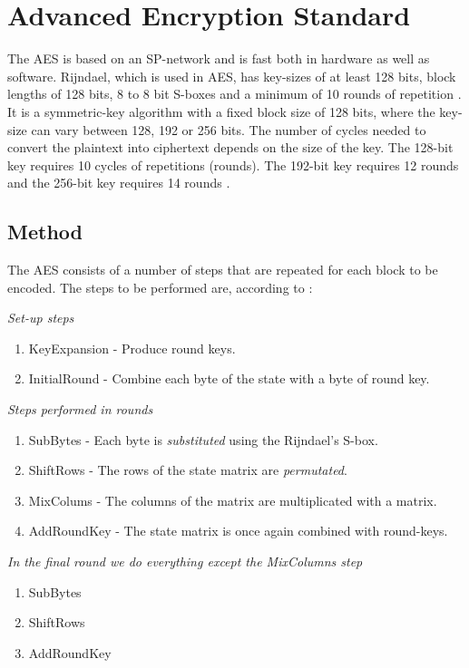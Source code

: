 \chapter{Advanced Encryption Standard}\label{ch:AES}
The AES is based on an SP-network and is fast both in hardware as well 
as software. Rijndael, which is used in AES, has key-sizes of at least 
128 bits, block lengths of 128 bits, 8 to 8 bit S-boxes and a minimum 
of 10 rounds of repetition \citep[p. 79]{Stinson:2006}. It is a 
symmetric-key algorithm with a fixed block size of 128 bits, where the 
key-size can vary between 128, 192 or 256 bits. The number of cycles 
needed to convert the plaintext into ciphertext depends on the size of 
the key. The 128-bit key requires 10 cycles of repetitions (rounds). 
The 192-bit key requires 12 rounds and the 256-bit key requires 14 
rounds \citep[p. 103]{Stinson:2006}.

\section{Method}
The AES consists of a number of steps that are repeated for each block 
to be encoded. The steps to be performed are, according to 
\citet{Stinson:2006}:

\emph{Set-up steps}
\begin{enumerate}
\item KeyExpansion - Produce round keys.
\item InitialRound - Combine each byte of the state with a byte of 
  round key.
\end{enumerate}
\emph{Steps performed in rounds}
\begin{enumerate}
\item SubBytes - Each byte is \emph{substituted} using the Rijndael's 
  S-box.
\item ShiftRows - The rows of the state matrix are \emph{permutated}.
\item MixColums - The columns of the matrix are multiplicated with a 
  matrix.
\item AddRoundKey - The state matrix is once again combined with 
  round-keys.
\end{enumerate}
\emph{In the final round we do everything except the MixColumns step}
\begin{enumerate}
\item SubBytes
\item ShiftRows
\item AddRoundKey
\end{enumerate}

